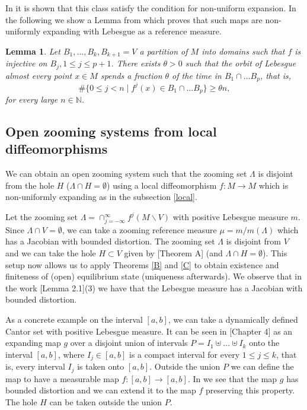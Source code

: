 \documentclass[12pt,a4paper]{amsart}
\theoremstyle{plain}
\newtheorem{lemma}{Lemma}[subsection]
\begin{document}
In \cite{A} it is shown that this class satisfy the condition for non-uniform expansion. In the following we show a Lemma from \cite{A} which proves that such maps are non-uniformly expanding with Lebesgue as a reference measure.
\begin{lemma}
	Let $B_{1},\dots, B_{k},B_{k+1}= V$ a partition of $M$ into domains such that $f$ is injective on $B_{j}, 1 \leq j \leq p+1$. There exists $\theta > 0$  such that the orbit of Lebesgue almost every point $x \in M$ spends a fraction $\theta$ of the time in $B_{1} \cap \dots B_{p}$, that is,
	\[
	\#\{0\leq j < n \mid f^{j}(x) \in B_{1} \cap \dots B_{p}\} \geq \theta n,
	\]
	for every large $n \in \mathbb{N}$.
\end{lemma}

\subsection{Open zooming systems from local diffeomorphisms} We can obtain an open zooming system such that the zooming set $\Lambda$ is disjoint from the hole $H$ ($\Lambda \cap H = \emptyset$) using a local diffeomorphism $f : M \to M$ which is non-uniformly expanding as in the subsection \ref{local}. 

Let the zooming set $\Lambda = \cap_{j=-\infty}^{\infty}f^{j}(M\backslash V)$ with positive Lebesgue measure $m$. Since $\Lambda \cap V = \emptyset$, we can take a zooming reference measure $\mu = m / m(\Lambda)$ which has a Jacobian with bounded distortion. The zooming set $\Lambda$ is disjoint from $V$ and we can take  the hole $H \subset V$ given by \cite{S}[Theorem A] (and $\Lambda \cap H = \emptyset$). This setup now allows us to apply Theorems \ref{B} and \ref{C} to obtain existence and finiteness of (open) equilibrium state (uniqueness afterwards). We observe that in the work \cite{ALP2}[Lemma 2.1](3) we have that the Lebesgue measure has a Jacobian with bounded distortion.

As a concrete example on the interval $[a,b]$, we can take a dynamically defined Cantor set with positive Lebesgue measure. It can be seen in \cite{PT}[Chapter 4] as an expanding map $g$ over a disjoint union of intervals $P = I_{1} \uplus \dots \uplus I_{k}$ onto the interval $[a,b]$, where $I_{j} \in [a,b]$ is a compact interval for every $1 \leq j \leq k$, that is, every interval $I_{j}$ is taken onto $[a,b]$. Outside the union $P$ we can define the map to have a measurable map $f:[a,b] \to [a,b]$. In \cite{PT} we see that the map $g$ has bounded distortion and we can extend it to the map $f$ preserving this property. The hole $H$ can be taken outside the union $P$.
\end{document}
